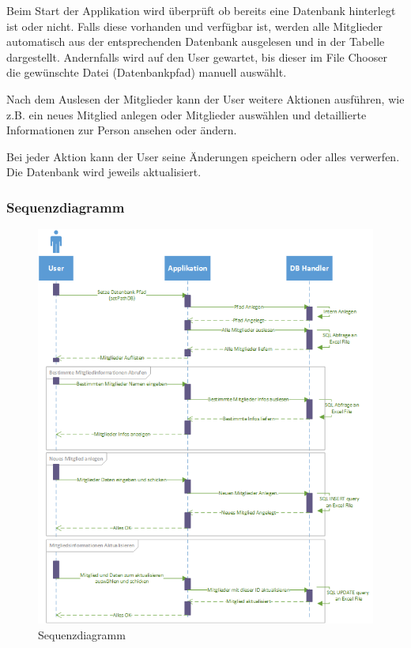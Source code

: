 \documentclass{article}
\begin{document}
Beim Start der Applikation wird überprüft ob bereits eine Datenbank hinterlegt ist oder nicht. Falls diese vorhanden und verfügbar ist, werden alle Mitglieder automatisch aus der entsprechenden Datenbank ausgelesen und in der Tabelle dargestellt. Andernfalls wird auf den User gewartet, bis dieser im File Chooser die gewünschte Datei (Datenbankpfad) manuell auswählt. 

Nach dem Auslesen der Mitglieder kann der User weitere Aktionen ausführen, wie z.B. ein neues Mitglied anlegen oder Mitglieder auswählen und detaillierte Informationen zur Person ansehen oder ändern.

Bei jeder Aktion kann der User seine Änderungen speichern oder alles verwerfen. Die Datenbank wird jeweils aktualisiert.

\newpage


\subsubsection{Sequenzdiagramm}
\begin{figure}[h]
	\centering
	\includegraphics[width=0.8 \textwidth]{Sequenz-Diagramm_v1}
	\caption{Sequenzdiagramm}
\end{figure}
\end{document}
